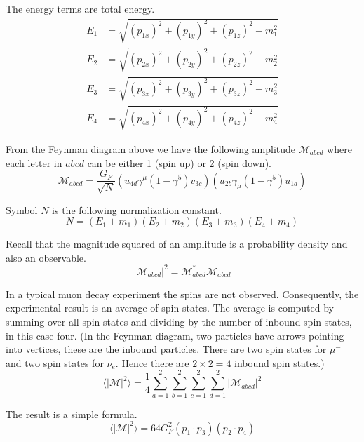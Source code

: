 \documentclass[12pt]{article}
\begin{document}
\noindent
The energy terms are total energy.
\begin{align*}
E_1&=\sqrt{(p_{1x})^2+(p_{1y})^2+(p_{1z})^2+m_1^2}
\\[1ex]
E_2&=\sqrt{(p_{2x})^2+(p_{2y})^2+(p_{2z})^2+m_2^2}
\\[1ex]
E_3&=\sqrt{(p_{3x})^2+(p_{3y})^2+(p_{3z})^2+m_3^2}
\\[1ex]
E_4&=\sqrt{(p_{4x})^2+(p_{4y})^2+(p_{4z})^2+m_4^2}
\end{align*}

\noindent
From the Feynman diagram above we have the following amplitude $\mathcal{M}_{abcd}$
where each letter in $abcd$ can be either 1 (spin up) or 2 (spin down).
\begin{equation*}
\mathcal{M}_{abcd}=\frac{G_F}{\sqrt{N}}
\left(\bar{u}_{4d}\gamma^\mu(1-\gamma^5)v_{3c}\right)
\left(\bar{u}_{2b}\gamma_\mu(1-\gamma^5)u_{1a}\right)
\end{equation*}

\noindent
Symbol $N$ is the following normalization constant.
\begin{equation*}
N=(E_1+m_1)(E_2+m_2)(E_3+m_3)(E_4+m_4)
\end{equation*}

\noindent
Recall that the magnitude squared of an amplitude is a probability density and also an observable.
\begin{equation*}
|\mathcal{M}_{abcd}|^2=\mathcal{M}_{abcd}^*\mathcal{M}_{abcd}
\end{equation*}

\noindent
In a typical muon decay experiment the spins are not observed.
Consequently, the experimental result is an average of spin states.
The average is computed by summing over all spin states and dividing by the number of inbound spin states,
in this case four.
(In the Feynman diagram, two particles have arrows pointing into vertices,
these are the inbound particles.
There are two spin states for $\mu^-$ and two spin states for $\bar{\nu}_e$.
Hence there are $2\times2=4$ inbound spin states.)
\begin{equation*}
\langle|\mathcal{M}|^2\rangle=
\frac{1}{4}
\sum_{a=1}^2\sum_{b=1}^2\sum_{c=1}^2\sum_{d=1}^2
|\mathcal{M}_{abcd}|^2
\end{equation*}

\noindent
The result is a simple formula.
\begin{equation*}
\langle|\mathcal{M}|^2\rangle=64G_F^2(p_1\cdot p_3)(p_2\cdot p_4)
\tag{1}
\end{equation*}
\end{document}
